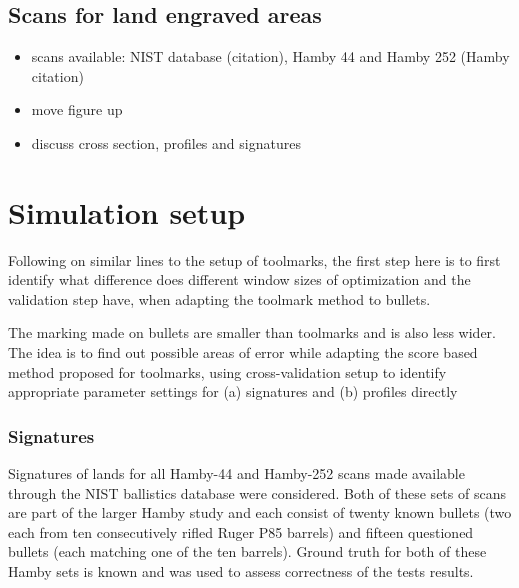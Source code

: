 \documentclass[12pt]{article}
\providecommand{\tightlist}{%
  \setlength{\itemsep}{0pt}\setlength{\parskip}{0pt}}
\begin{document}

\subsection{Scans for land engraved
areas}\label{scans-for-land-engraved-areas-1}

\begin{itemize}
\tightlist
\item
  scans available: NIST database (citation), Hamby 44 and Hamby 252
  (Hamby citation)
\item
  move figure up
\item
  discuss cross section, profiles and signatures
\end{itemize}

\section{Simulation setup}\label{simulation-setup}

Following on similar lines to the setup of toolmarks, the first step
here is to first identify what difference does different window sizes of
optimization and the validation step have, when adapting the toolmark
method to bullets.

The marking made on bullets are smaller than toolmarks and is also less
wider. The idea is to find out possible areas of error while adapting
the score based method proposed for toolmarks, using cross-validation
setup to identify appropriate parameter settings for (a) signatures and
(b) profiles directly

\subsubsection{Signatures}\label{signatures}

Signatures of lands for all Hamby-44 and Hamby-252 scans made available
through the NIST ballistics database \citep{nist} were considered. Both
of these sets of scans are part of the larger Hamby study \citep{hamby}
and each consist of twenty known bullets (two each from ten
consecutively rifled Ruger P85 barrels) and fifteen questioned bullets
(each matching one of the ten barrels). Ground truth for both of these
Hamby sets is known and was used to assess correctness of the tests
results.
\end{document}
